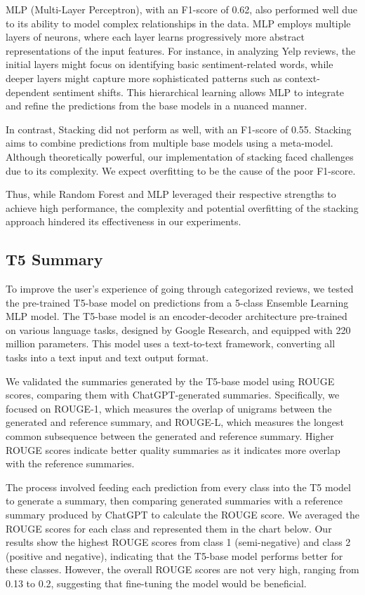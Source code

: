 \documentclass[11pt]{article}
\begin{document}
MLP (Multi-Layer Perceptron), with an F1-score of 0.62, also performed well due to its ability to model complex relationships in the data. MLP employs multiple layers of neurons, where each layer learns progressively more abstract representations of the input features. For instance, in analyzing Yelp reviews, the initial layers might focus on identifying basic sentiment-related words, while deeper layers might capture more sophisticated patterns such as context-dependent sentiment shifts. This hierarchical learning allows MLP to integrate and refine the predictions from the base models in a nuanced manner.

In contrast, Stacking did not perform as well, with an F1-score of 0.55. Stacking aims to combine predictions from multiple base models using a meta-model. Although theoretically powerful, our implementation of stacking faced challenges due to its complexity. We expect overfitting to be the cause of the poor F1-score.

Thus, while Random Forest and MLP leveraged their respective strengths to achieve high performance, the complexity and potential overfitting of the stacking approach hindered its effectiveness in our experiments.

\subsection{T5 Summary}
To improve the user’s experience of going through categorized reviews, we tested the pre-trained T5-base model on predictions from a 5-class Ensemble Learning MLP model. The T5-base model is an encoder-decoder architecture pre-trained on various language tasks, designed by Google Research, and equipped with 220 million parameters. This model uses a text-to-text framework, converting all tasks into a text input and text output format.

We validated the summaries generated by the T5-base model using ROUGE scores, comparing them with ChatGPT-generated summaries. Specifically, we focused on ROUGE-1, which measures the overlap of unigrams between the generated and reference summary, and ROUGE-L, which measures the longest common subsequence between the generated and reference summary. Higher ROUGE scores indicate better quality summaries as it indicates more overlap with the reference summaries.

The process involved feeding each prediction from every class into the T5 model to generate a summary, then comparing generated summaries with a reference summary produced by ChatGPT to calculate the ROUGE score. We averaged the ROUGE scores for each class and represented them in the chart below. Our results show the highest ROUGE scores from class 1 (semi-negative) and class 2 (positive and negative), indicating that the T5-base model performs better for these classes. However, the overall ROUGE scores are not very high, ranging from 0.13 to 0.2, suggesting that fine-tuning the model would be beneficial.
\end{document}
